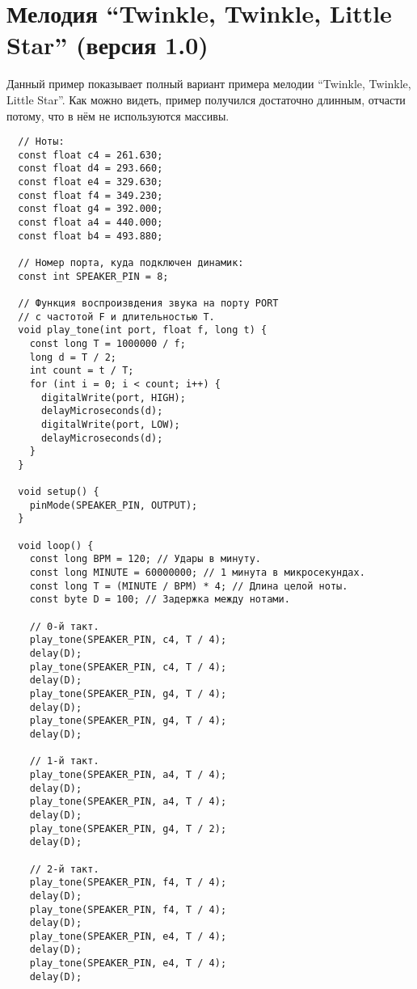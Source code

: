 \documentclass[../sparc.tex]{subfiles}
\begin{document}
\newpage
\chapter{Мелодия ``Twinkle, Twinkle, Little Star'' (версия 1.0)}
\label{app:twinkle-twinkle-little-star-01}

Данный пример показывает полный вариант примера мелодии ``Twinkle, Twinkle,
Little Star''.  Как можно видеть, пример получился достаточно длинным, отчасти
потому, что в нём не используются массивы.

\begin{verbatim}
  // Ноты:
  const float c4 = 261.630;
  const float d4 = 293.660;
  const float e4 = 329.630;
  const float f4 = 349.230;
  const float g4 = 392.000;
  const float a4 = 440.000;
  const float b4 = 493.880;

  // Номер порта, куда подключен динамик:
  const int SPEAKER_PIN = 8;

  // Функция воспроизвдения звука на порту PORT
  // с частотой F и длительностью T.
  void play_tone(int port, float f, long t) {
    const long T = 1000000 / f;
    long d = T / 2;
    int count = t / T;
    for (int i = 0; i < count; i++) {
      digitalWrite(port, HIGH);
      delayMicroseconds(d);
      digitalWrite(port, LOW);
      delayMicroseconds(d);
    }
  }

  void setup() {
    pinMode(SPEAKER_PIN, OUTPUT);
  }

  void loop() {
    const long BPM = 120; // Удары в минуту.
    const long MINUTE = 60000000; // 1 минута в микросекундах.
    const long T = (MINUTE / BPM) * 4; // Длина целой ноты.
    const byte D = 100; // Задержка между нотами.

    // 0-й такт.
    play_tone(SPEAKER_PIN, c4, T / 4);
    delay(D);
    play_tone(SPEAKER_PIN, c4, T / 4);
    delay(D);
    play_tone(SPEAKER_PIN, g4, T / 4);
    delay(D);
    play_tone(SPEAKER_PIN, g4, T / 4);
    delay(D);

    // 1-й такт.
    play_tone(SPEAKER_PIN, a4, T / 4);
    delay(D);
    play_tone(SPEAKER_PIN, a4, T / 4);
    delay(D);
    play_tone(SPEAKER_PIN, g4, T / 2);
    delay(D);

    // 2-й такт.
    play_tone(SPEAKER_PIN, f4, T / 4);
    delay(D);
    play_tone(SPEAKER_PIN, f4, T / 4);
    delay(D);
    play_tone(SPEAKER_PIN, e4, T / 4);
    delay(D);
    play_tone(SPEAKER_PIN, e4, T / 4);
    delay(D);


\end{verbatim}
\end{document}
